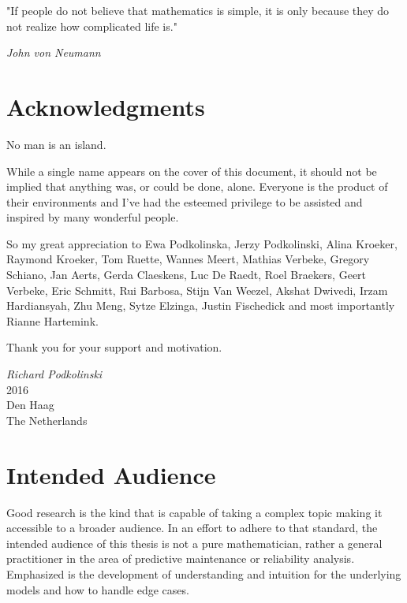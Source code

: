 \vspace*{40px}
\begin{displayquote}
"If people do not believe that mathematics is simple, it is only because they do not realize how complicated life is." 
\end{displayquote}

\begin{flushright}
\textit{John von Neumann}
\end{flushright}

\vspace*{25px}

\section*{Acknowledgments}

No man is an island.

While a single name appears on the cover of this document, it should not be implied that anything was, or could be done, alone. Everyone is the product of their environments and I've had the esteemed privilege to be assisted and inspired by many wonderful people. 

So my great appreciation to Ewa Podkolinska, Jerzy Podkolinski, Alina Kroeker, Raymond Kroeker, Tom Ruette, Wannes Meert, Mathias Verbeke, Gregory Schiano, Jan Aerts, Gerda Claeskens, Luc De Raedt, Roel Braekers, Geert Verbeke, Eric Schmitt, Rui Barbosa, Stijn Van Weezel, Akshat Dwivedi, Irzam Hardiansyah, Zhu Meng, Sytze Elzinga, Justin Fischedick and most importantly Rianne Hartemink.

Thank you for your support and motivation. 

\begin{flushright}
\textit{Richard Podkolinski}
\\
2016 
\\
Den Haag
\\
The Netherlands
\end{flushright}

\vspace*{25px}

\section*{Intended Audience}

Good research is the kind that is capable of taking a complex topic making it accessible to a broader audience. In an effort to adhere to that standard, the intended audience of this thesis is not a pure mathematician, rather a general practitioner in the area of predictive maintenance or reliability analysis. Emphasized is the development of understanding and intuition for the underlying models and how to handle edge cases. 

